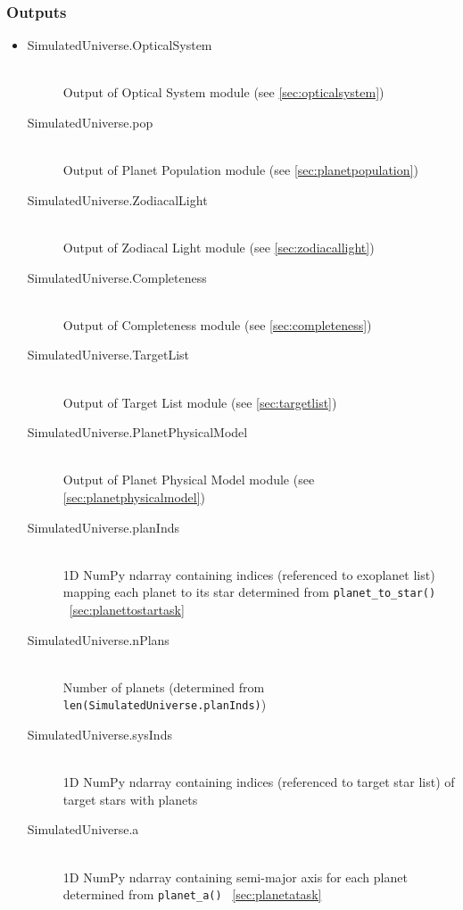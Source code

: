 \documentclass[cleanfoot]{asme2ej}
\begin{document}
\subsubsection*{Outputs}
\begin{itemize}
    \item
    \begin{description}
        \item[SimulatedUniverse.OpticalSystem] \hfill \\
        Output of Optical System module (see \ref{sec:opticalsystem})
        \item[SimulatedUniverse.pop] \hfill \\
        Output of Planet Population module (see \ref{sec:planetpopulation})
        \item[SimulatedUniverse.ZodiacalLight] \hfill \\
        Output of Zodiacal Light module (see \ref{sec:zodiacallight})
        \item[SimulatedUniverse.Completeness] \hfill \\
        Output of Completeness module (see \ref{sec:completeness})
        \item[SimulatedUniverse.TargetList] \hfill \\
        Output of Target List module (see \ref{sec:targetlist})
        \item[SimulatedUniverse.PlanetPhysicalModel] \hfill \\
        Output of Planet Physical Model module (see \ref{sec:planetphysicalmodel})
        \item[SimulatedUniverse.planInds] \hfill \\
        1D NumPy ndarray containing indices (referenced to exoplanet list) mapping each planet to its star determined from \verb+planet_to_star()+ ~\ref{sec:planettostartask}
        \item[SimulatedUniverse.nPlans] \hfill \\
        Number of planets (determined from \verb+len(SimulatedUniverse.planInds)+)
        \item[SimulatedUniverse.sysInds] \hfill \\
        1D NumPy ndarray containing indices (referenced to target star list) of target stars with planets
        \item[SimulatedUniverse.a] \hfill \\
        1D NumPy ndarray containing semi-major axis for each planet determined from \verb+planet_a()+ ~\ref{sec:planetatask}

\end{description}
\end{itemize}
\end{document}
